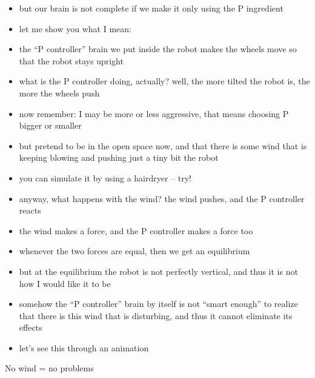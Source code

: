 \begin{frame}
	\begin{footnotesize}
	\begin{itemize}
		\item but our brain is not complete if we make it only using the P ingredient
		\item let me show you what I mean:
		\item the ``P controller'' brain we put inside the robot makes the wheels move so that the robot stays upright
		\item what is the P controller doing, actually? well, the more tilted the robot is, the more the wheels push
		\item now remember: I may be more or less aggressive, that means choosing P bigger or smaller
		\item but pretend to be in the open space now, and that there is some wind that is keeping blowing and pushing just a tiny bit the robot
		\item you can simulate it by using a hairdryer -- try!
		\item anyway, what happens with the wind? the wind pushes, and the P controller reacts
		\item the wind makes a force, and the P controller makes a force too
		\item whenever the two forces are equal, then we get an equilibrium
		\item but at the equilibrium the robot is not perfectly vertical, and thus it is not how I would like it to be
		\item somehow the ``P controller'' brain by itself is not ``smart enough'' to realize that there is this wind that is disturbing, and thus it cannot eliminate its effects
		\item let's see this through an animation
	\end{itemize}
	\end{footnotesize}
\end{frame}


\begin{frame}[t]{No wind = no problems}
	\begin{center}
	\end{center}
\end{frame}


